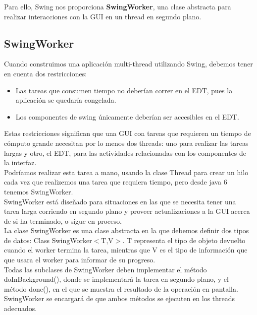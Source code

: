 \documentclass[12pt, a4paper]{article}
\begin{document}
Para ello, Swing nos proporciona \textbf{SwingWorker}, una clase abstracta para realizar interacciones con la \gls{GUI} en un thread en segundo plano.

\subsection{SwingWorker}

Cuando construimos una aplicación multi-thread utilizando Swing, debemos tener en cuenta dos restricciones:

\begin{itemize}
	\item Las tareas que consumen tiempo no deberían correr en el \gls{EDT}, pues la aplicación se quedaría congelada.
	\item Los componentes de swing únicamente deberían ser accesibles en el \gls{EDT}.
\end{itemize}

Estas restricciones significan que una \gls{GUI} con tareas que requieren un tiempo de cómputo grande necesitan por lo menos dos threads: uno para realizar las tareas largas y otro, el \gls{EDT}, para las actividades relacionadas con los componentes de la interfaz.\\

Podríamos realizar esta tarea a mano, usando la clase Thread para crear un hilo cada vez que realizemos una tarea que requiera tiempo, pero desde java 6 tenemos SwingWorker.\\

SwingWorker está diseñado para situaciones en las que se necesita tener una tarea larga corriendo en segundo plano y proveer actualizaciones a la \gls{GUI} acerca de si ha terminado, o sigue en proceso.\\

La clase SwingWorker es una clase abstracta en la que debemos definir dos tipos de datos: Class SwingWorker$<$T,V$>$. T representa el tipo de objeto devuelto cuando el worker termina la tarea, mientras que V es el tipo de información que que usara el worker para informar de su progreso.\\

Todas las subclases de SwingWorker deben implementar el método doInBackground(), donde se implementará la tarea en segundo plano, y el método done(), en el que se muestra el resultado de la operación en pantalla. SwingWorker se encargará de que ambos métodos se ejecuten en los threads adecuados.\\
\end{document}
